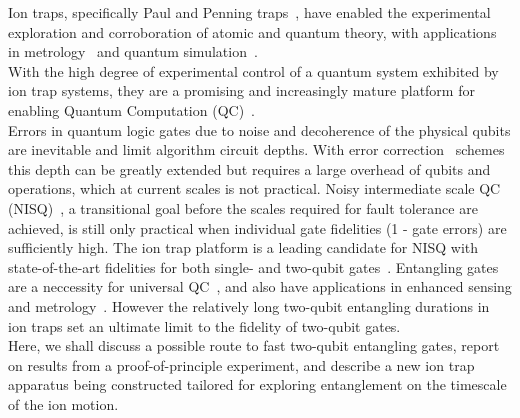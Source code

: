 \documentclass[12pt]{iopart}
\begin{document}
Ion traps, specifically Paul and Penning traps~\cite{paul_electromagnetic_1990, wineland_experimental_1998}, have enabled the
experimental exploration and corroboration of atomic and quantum
theory, with applications in metrology~\cite{ludlow_optical_2015} and quantum simulation~\cite{blatt_quantum_2012}. \\ With the high
degree of experimental control of a quantum system exhibited by ion
trap systems, they are a promising and increasingly mature platform
for enabling Quantum Computation (QC)~\cite{ozeri_tutorial_2011}.\\ Errors in quantum logic gates
due to noise and decoherence of the physical qubits are inevitable and
limit algorithm circuit depths. With error correction~\cite{steane_overhead_2003} schemes
this depth can be greatly extended but requires a large overhead of qubits
and operations, which at current scales is not practical.
Noisy intermediate scale QC (NISQ)~\cite{preskill_quantum_2018}, a transitional goal before the scales required for fault tolerance are achieved, is still only practical when individual gate fidelities (1 -
gate errors) are sufficiently high.  The ion trap platform is a leading
candidate for NISQ with state-of-the-art fidelities
for both single- and two-qubit gates~\cite{srinivas_high-fidelity_2021, ballance_high-fidelity_2016, harty_high-fidelity_2014}.  Entangling gates
are a neccessity for universal QC~\cite{divincenzo_physical_2000, blatt_entangled_2008}, and also have applications in
enhanced sensing and metrology~\cite{ono_entanglement-enhanced_2013, nichol_elementary_2022}.
However the relatively long two-qubit entangling durations in ion
traps set an ultimate limit to the fidelity of two-qubit gates.\\
Here, we shall discuss a possible route to fast two-qubit entangling
gates, report on results from a proof-of-principle experiment,
and describe a new ion trap apparatus being constructed tailored for
exploring entanglement on the timescale of the ion motion.\\
\end{document}
